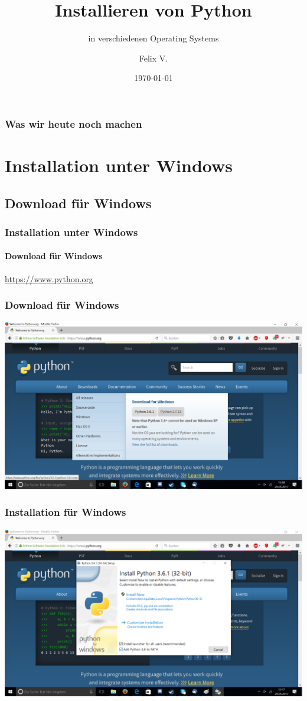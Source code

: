 \documentclass{beamer}
\title{Installieren von Python}
\subtitle{in verschiedenen Operating Systems}
\author{Felix V.}
\date{\today}
\begin{document}
\begin{frame}
\titlepage
\end{frame}

\begin{frame}
  \frametitle{Was wir heute noch machen}
  \tableofcontents  
\end{frame}
\section{Installation unter Windows}
\subsection{Download für Windows}
\begin{frame}
  \frametitle{Installation unter Windows}
  \framesubtitle{Download für Windows}
  \url{https://www.python.org}
\end{frame}
\begin{frame}
  \frametitle{Download für Windows}
  \includegraphics[width=\textwidth]{./screenshotWin0.png}
\end{frame}
\begin{frame}
  \frametitle{Installation für Windows}
  \includegraphics[width=\textwidth]{./screenshotWin1.png}
\end{frame}
\end{document}
